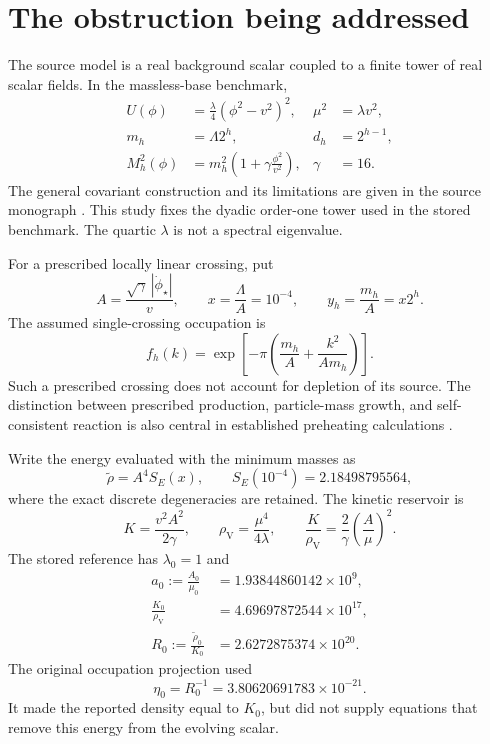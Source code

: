 \documentclass[11pt]{article}
\theoremstyle{definition}\newtheorem{definition}[theorem]{Definition}
\newcommand{\rhoV}{\rho_{\mathrm V}}
\begin{document}
\section{The obstruction being addressed}
The source model is a real background scalar coupled to a finite tower of real scalar fields. In the massless-base benchmark,
\begin{align}
 U(\phi)&=\frac{\lambda}{4}(\phi^2-v^2)^2,
 &\mu^2&=\lambda v^2,\\
 m_h&=\Lambda 2^h,
 &d_h&=2^{h-1},\\
 M_h^2(\phi)&=m_h^2\left(1+\gamma\frac{\phi^2}{v^2}\right),
 &\gamma&=16.
\end{align}
The general covariant construction and its limitations are given in the source monograph \cite{komorebi}. This study fixes the dyadic order-one tower used in the stored benchmark. The quartic $\lambda$ is not a spectral eigenvalue.

For a prescribed locally linear crossing, put
\begin{equation}
 A=\frac{\sqrt\gamma\,|\dot\phi_\star|}{v},\qquad
 x=\frac\Lambda A=10^{-4},\qquad y_h=\frac{m_h}{A}=x2^h.
\end{equation}
The assumed single-crossing occupation is
\begin{equation}
 f_h(k)=\exp\!\left[-\pi\left(\frac{m_h}{A}+\frac{k^2}{Am_h}\right)\right].
 \label{eq:gaussian}
\end{equation}
Such a prescribed crossing does not account for depletion of its source. The distinction between prescribed production, particle-mass growth, and self-consistent reaction is also central in established preheating calculations \cite{kls,instant}.

Write the energy evaluated with the minimum masses as
\begin{equation}
 \widetilde\rho=A^4 S_E(x),\qquad S_E(10^{-4})=2.18498795564,
 \label{eq:SE}
\end{equation}
where the exact discrete degeneracies are retained. The kinetic reservoir is
\begin{equation}
 K=\frac{v^2 A^2}{2\gamma},\qquad
 \rhoV=\frac{\mu^4}{4\lambda},\qquad
 \frac K{\rhoV}=\frac{2}{\gamma}\left(\frac A\mu\right)^2.
 \label{eq:kinetic}
\end{equation}
The stored reference has $\lambda_0=1$ and
\begin{align}
 a_0:=\frac{A_0}{\mu_0}&=1.93844860142\times10^9,\\
 \frac{K_0}{\rhoV}&=4.69697872544\times10^{17},\\
 R_0:=\frac{\widetilde\rho_0}{K_0}
 &=2.6272875374\times10^{20}.
\end{align}
The original occupation projection used
\begin{equation}
 \eta_0=R_0^{-1}=3.80620691783\times10^{-21}.
 \label{eq:eta}
\end{equation}
It made the reported density equal to $K_0$, but did not supply equations that remove this energy from the evolving scalar.
\end{document}
